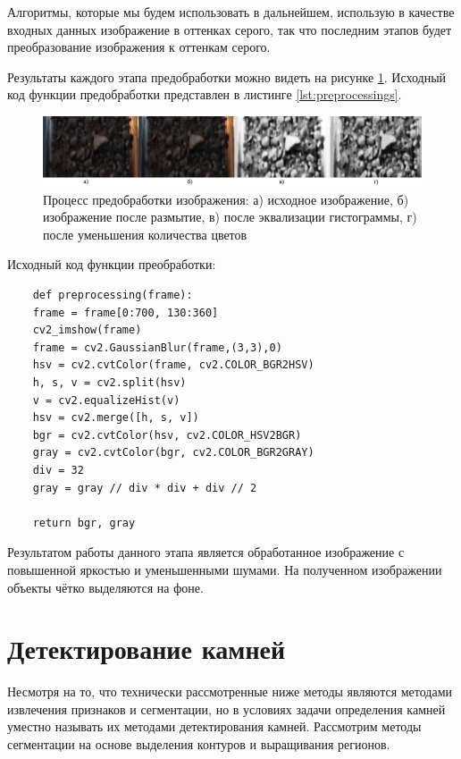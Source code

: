 \documentclass[times]{itmo-student-thesis}
\begin{document}
Алгоритмы, которые мы будем использовать в дальнейшем, использую в качестве входных данных изображение в оттенках серого, так что последним этапов будет преобразование изображения к оттенкам серого. 

Результаты каждого этапа предобработки можно видеть на рисунке \ref{fig:preprocessing}. Исходный код функции предобработки представлен в листинге \ref{lst:preprocessings}.
\begin{figure}[h!]
	\centering
	\includegraphics[width=\linewidth]{images/preprocessing}
	\caption{Процесс предобработки изображения: а) исходное изображение, б) изображение после размытие, в) после эквализации гистограммы, г) после уменьшения количества цветов }
	\label{fig:preprocessing}
\end{figure}

\begin{algorithm}[!h]
	\caption{Исходный код функции преобработки:}\label{lst:preprocessing}
	\begin{lstlisting}
	def preprocessing(frame):
	frame = frame[0:700, 130:360]
	cv2_imshow(frame)
	frame = cv2.GaussianBlur(frame,(3,3),0)
	hsv = cv2.cvtColor(frame, cv2.COLOR_BGR2HSV)
	h, s, v = cv2.split(hsv)
	v = cv2.equalizeHist(v)
	hsv = cv2.merge([h, s, v])
	bgr = cv2.cvtColor(hsv, cv2.COLOR_HSV2BGR)
	gray = cv2.cvtColor(bgr, cv2.COLOR_BGR2GRAY)
	div = 32
	gray = gray // div * div + div // 2
	
	return bgr, gray
	\end{lstlisting}
\end{algorithm}

Результатом работы данного этапа является обработанное изображение с повышенной яркостью и уменьшенными шумами. На полученном изображении объекты чётко выделяются на фоне.


\section{Детектирование камней}
Несмотря на то, что технически рассмотренные ниже методы являются методами извлечения признаков и сегментации, но в условиях задачи определения камней уместно называть их методами детектирования камней. Рассмотрим методы сегментации на основе выделения контуров и выращивания регионов. 
\end{document}
